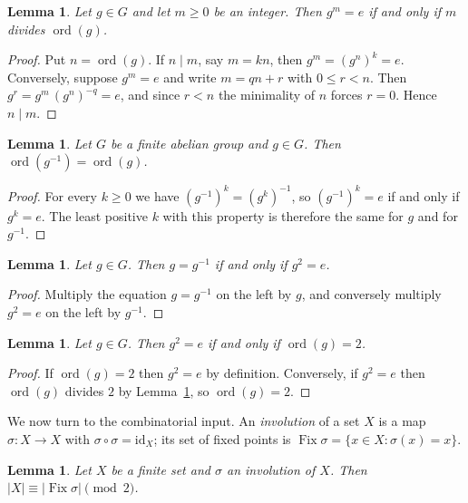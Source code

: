 \documentclass[11pt]{amsart}
\newtheorem{lemma}[theorem]{Lemma}
\theoremstyle{definition}
\theoremstyle{remark}
\DeclareMathOperator{\ord}{ord}
\DeclareMathOperator{\Fix}{Fix}
\begin{document}
\begin{lemma}\label{lem:div}
Let $g\in G$ and let $m\ge 0$ be an integer. Then $g^m=e$ if and only if $m$ divides $\ord(g)$.
\end{lemma}

\begin{proof}
Put $n=\ord(g)$. If $n\mid m$, say $m=kn$, then $g^m=(g^n)^k=e$. Conversely, suppose
$g^m=e$ and write $m=qn+r$ with $0\le r<n$. Then $g^r=g^m\,(g^n)^{-q}=e$, and since $r<n$
the minimality of $n$ forces $r=0$. Hence $n\mid m$.
\end{proof}

\begin{lemma}\label{lem:inv}
Let $G$ be a finite abelian group and $g\in G$. Then $\ord(g^{-1})=\ord(g)$.
\end{lemma}

\begin{proof}
For every $k\ge 0$ we have $(g^{-1})^k=(g^k)^{-1}$, so $(g^{-1})^k=e$ if and only if $g^k=e$.
The least positive $k$ with this property is therefore the same for $g$ and for $g^{-1}$.
\end{proof}

\begin{lemma}\label{lem:selfinv}
Let $g\in G$. Then $g=g^{-1}$ if and only if $g^2=e$.
\end{lemma}

\begin{proof}
Multiply the equation $g=g^{-1}$ on the left by $g$, and conversely multiply $g^2=e$ on the
left by $g^{-1}$.
\end{proof}

\begin{lemma}\label{lem:ord2}
Let $g\in G$. Then $g^2=e$ if and only if $\ord(g)=2$.
\end{lemma}

\begin{proof}
If $\ord(g)=2$ then $g^2=e$ by definition. Conversely, if $g^2=e$ then $\ord(g)$ divides $2$
by Lemma~\ref{lem:div}, so $\ord(g)=2$.
\end{proof}

We now turn to the combinatorial input. An \emph{involution} of a set $X$ is a map
$\sigma\colon X\to X$ with $\sigma\circ\sigma=\mathrm{id}_X$; its set of fixed points is
$\Fix\sigma=\{x\in X:\sigma(x)=x\}$.

\begin{lemma}\label{lem:parity}
Let $X$ be a finite set and $\sigma$ an involution of $X$. Then
$|X|\equiv|\Fix\sigma|\pmod 2$.
\end{lemma}
\end{document}
